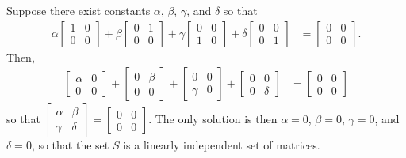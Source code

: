Suppose there exist constants $\alpha$, $\beta$, $\gamma$, and $\delta$ so that 
\begin{align*}
\alpha \begin{bmatrix} 1 & 0 \\ 0 & 0 \end{bmatrix} + 
\beta \begin{bmatrix} 0 & 1 \\ 0 & 0 \end{bmatrix} +
\gamma \begin{bmatrix} 0 & 0 \\ 1 & 0 \end{bmatrix} +
\delta \begin{bmatrix} 0 & 0 \\ 0 & 1 \end{bmatrix} 
&=
\begin{bmatrix} 0 & 0 \\ 0 & 0 \end{bmatrix} .
\end{align*}
Then,
\begin{align*}
\begin{bmatrix}\alpha & 0 \\ 0 & 0 \end{bmatrix} + 
 \begin{bmatrix} 0 & \beta \\ 0 & 0 \end{bmatrix} +
\begin{bmatrix} 0 & 0 \\ \gamma & 0 \end{bmatrix} +
 \begin{bmatrix} 0 & 0 \\ 0 & \delta \end{bmatrix} 
&=
\begin{bmatrix} 0 & 0 \\ 0 & 0 \end{bmatrix}
\end{align*}
so that 
$\begin{bmatrix} 
\alpha & \beta \\
 \gamma & \delta 
\end{bmatrix} 
= 
\begin{bmatrix} 
0 & 0 \\ 
0 & 0 
\end{bmatrix}$.  
The only solution is then $\alpha = 0$, $\beta = 0$, $\gamma = 0$, and $\delta = 0$, so that the set $S$ is a linearly independent set of matrices. 
